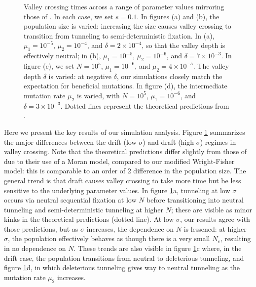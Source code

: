 \documentclass[10pt,twocolumn,twoside]{gsajnl}
\begin{document}
\begin{spacing}{1.5}
\begin{figure}[!t]
  \caption{Valley crossing times across a range of parameter values mirroring those of \citet{weissman_2009}. In each case, we set $s = 0.1$. In figures (a) and (b), the population size is varied: increasing the size causes valley crossing to transition from tunneling to semi-deterministic fixation. In (a), $\mu_1 = 10^{-5}$, $\mu_2 = 10^{-4}$, and $\delta = 2 \times 10^{-4}$, so that the valley depth is effectively neutral; in (b), $\mu_1 = 10^{-5}$, $\mu_2 = 10^{-6}$, and $\delta = 7 \times 10^{-3}$. In figure (c), we set $N = 10^5$, $\mu_1 = 10^{-6}$, and $\mu_2 = 4 \times 10^{-5}$. The valley depth $\delta$ is varied: at negative $\delta$, our simulations closely match the expectation for beneficial mutations. In figure (d), the intermediate mutation rate $\mu_2$ is varied, with $N = 10^{5}$, $\mu_1 = 10^{-6}$, and $\delta = 3 \times 10^{-3}$. Dotted lines represent the theoretical predictions from \citet{weissman_2009}.}
\label{fig:weissman}
\end{figure}

Here we present the key results of our simulation analysis.
Figure \ref{fig:weissman} summarizes the major differences between the drift (low $\sigma$) and draft (high $\sigma$) regimes in valley crossing.
Note that the theoretical predictions differ slightly from those of \citet{weissman_2009} due to their use of a Moran model, compared to our modified Wright-Fisher model: this is comparable to an order of 2 difference in the population size.
The general trend is that draft causes valley crossing to take more time but be less sensitive to the underlying parameter values.
In figure \ref{fig:weissman}a, tunneling at low $\sigma$ occurs via neutral sequential fixation at low $N$ before transitioning into neutral tunneling and semi-deterministic tunneling at higher $N$; these are visible as minor kinks in the theoretical predictions (dotted line).
At low $\sigma$, our results agree with those predictions, but as $\sigma$ increases, the dependence on $N$ is lessened: at higher $\sigma$, the population effectively behaves as though there is a very small $N_e$, resulting in no dependence on $N$.
These trends are also visible in figure \ref{fig:weissman}c where, in the drift case, the population transitions from neutral to deleterious tunneling, and figure \ref{fig:weissman}d, in which deleterious tunneling gives way to neutral tunneling as the mutation rate $\mu_2$ increases.


\end{spacing}
\end{document}

